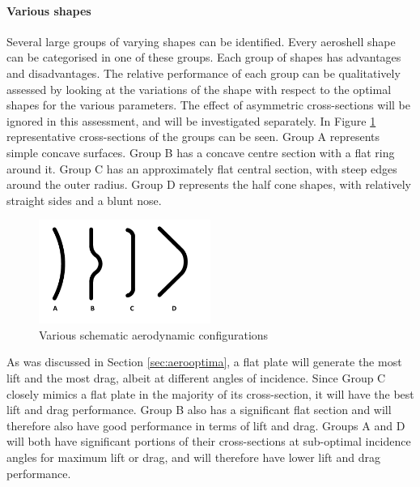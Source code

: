 \paragraph{Various shapes} \label{sec:aeroshapes}
Several large groups of varying shapes can be identified. Every aeroshell shape can be categorised in one of these groups.  Each group of shapes has advantages and disadvantages. The relative performance of each group can be qualitatively assessed by looking at the variations of the shape with respect to the optimal shapes for the various parameters. The effect of asymmetric cross-sections will be ignored in this assessment, and will be investigated separately. In Figure \ref{fig:aeroshapes} representative cross-sections of the groups can be seen. Group A represents simple concave surfaces. Group B has a concave centre section with a flat ring around it. Group C has an approximately flat central section, with steep edges around the outer radius. Group D represents the half cone shapes, with relatively straight sides and a blunt nose. 

\begin{figure}[h]
	\centering
	\includegraphics[width=0.5\textwidth]{./Figure/Aerodynamics/AeroShapes.pdf}
	\caption{Various schematic aerodynamic configurations}
	\label{fig:aeroshapes}
\end{figure}

As was discussed in Section \ref{sec:aerooptima}, a flat plate will generate the most lift and the most drag, albeit at different angles of incidence. Since Group C closely mimics a flat plate in the majority of its cross-section, it will have the best lift and drag performance. Group B also has a significant flat section and will therefore also have good performance in terms of lift and drag. Groups A and D will both have significant portions of their cross-sections at sub-optimal incidence angles for maximum lift or drag, and will therefore have lower lift and drag performance.

